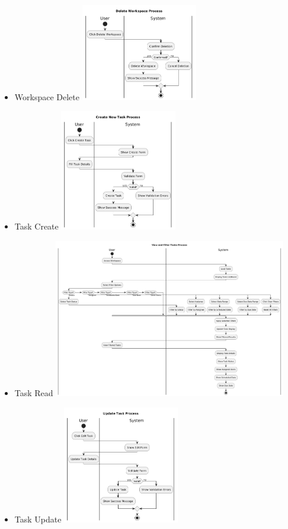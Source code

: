 \begin{itemize}
  \item Workspace Delete
  \newline
  \includegraphics[width=0.4\textwidth]{assets/activity_diagrams/workspace_delete.png}
  \item Task Create
  \newline
  \includegraphics[width=0.4\textwidth]{assets/activity_diagrams/task_create.png}
  \item Task Read
  \newline
  \includegraphics[width=0.8\textwidth]{assets/activity_diagrams/task_read.png}
  \item Task Update
  \newline
  \includegraphics[width=0.4\textwidth]{assets/activity_diagrams/task_update.png}

\end{itemize}
